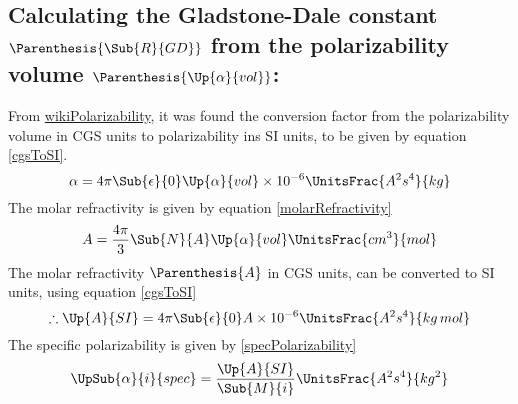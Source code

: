         \subsection{Calculating the Gladstone-Dale constant $\Parenthesis{\Sub{R}{GD}}$ from the polarizability volume $\Parenthesis{\Up{\alpha}{vol}}$:}
            \indent From \href{https://en.wikipedia.org/wiki/Polarizability}{wikiPolarizability}, it was found the conversion factor from the polarizability volume in CGS units to polarizability ins SI units, to be given by equation \eqref{cgsToSI}. 
            \begin{equation}\label{cgsToSI}
                \alpha = 4\pi\Sub{\epsilon}{0}\Up{\alpha}{vol}\times10^{-6}\UnitsFrac{A^2s^4}{kg} 
            \end{equation}
            \indent The molar refractivity is given by equation \eqref{molarRefractivity} 
            \begin{equation}\label{molarRefractivity}
                A = \frac{4\pi}{3}\Sub{N}{A}\Up{\alpha}{vol}\UnitsFrac{cm^3}{mol} 
            \end{equation}
            \indent The molar refractivity $\Parenthesis{A}$ in CGS units, can be converted to SI units, using equation \eqref{cgsToSI}
            $$ \therefore \Up{A}{SI} = 4\pi\Sub{\epsilon}{0}A\times 10^{-6}\UnitsFrac{A^2s^4}{kg\,mol} $$
            \indent The specific polarizability is given by \eqref{specPolarizability}
            \begin{equation}\label{specPolarizability}
                \UpSub{\alpha}{i}{spec} = \frac{\Up{A}{SI}}{\Sub{M}{i}}\UnitsFrac{A^2s^4}{kg^2}
            \end{equation}


